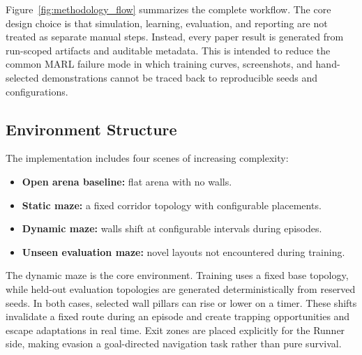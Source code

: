 \documentclass[journal]{IEEEtran}
\begin{document}
Figure~\ref{fig:methodology_flow} summarizes the complete workflow. The core design choice is that simulation, learning, evaluation, and reporting are not treated as separate manual steps. Instead, every paper result is generated from run-scoped artifacts and auditable metadata. This is intended to reduce the common MARL failure mode in which training curves, screenshots, and hand-selected demonstrations cannot be traced back to reproducible seeds and configurations.

\subsection{Environment Structure}

The implementation includes four scenes of increasing complexity:
\begin{itemize}
    \item \textbf{Open arena baseline:} flat arena with no walls.
    \item \textbf{Static maze:} a fixed corridor topology with configurable placements.
    \item \textbf{Dynamic maze:} walls shift at configurable intervals during episodes.
    \item \textbf{Unseen evaluation maze:} novel layouts not encountered during training.
\end{itemize}

The dynamic maze is the core environment. Training uses a fixed base topology, while held-out evaluation topologies are generated deterministically from reserved seeds. In both cases, selected wall pillars can rise or lower on a timer. These shifts invalidate a fixed route during an episode and create trapping opportunities and escape adaptations in real time. Exit zones are placed explicitly for the Runner side, making evasion a goal-directed navigation task rather than pure survival.
\end{document}
